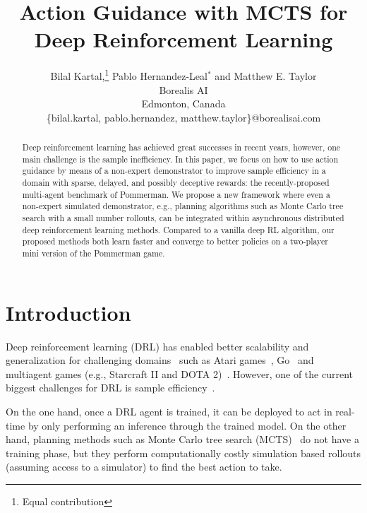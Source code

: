 \documentclass[letterpaper]{article} %
\title{Action Guidance with MCTS for Deep Reinforcement Learning} %
\author{Bilal Kartal,\thanks{Equal contribution} Pablo Hernandez-Leal$^*$ and Matthew E. Taylor\\
Borealis AI\\
Edmonton, Canada\\
\{bilal.kartal, pablo.hernandez, matthew.taylor\}@borealisai.com
}
\begin{document}
\maketitle

\begin{abstract}

Deep reinforcement learning has achieved great successes in recent years, however, one main challenge is the sample inefficiency. In this paper, we focus on how to use action guidance by means of a non-expert demonstrator to improve sample efficiency in a domain with sparse, delayed, and possibly deceptive rewards: the recently-proposed multi-agent benchmark of Pommerman. We propose a new framework where even a non-expert simulated demonstrator, e.g., planning algorithms such as Monte Carlo tree search with a small number rollouts, can be integrated within asynchronous distributed deep reinforcement learning methods. Compared to a vanilla deep RL algorithm, our proposed methods both learn faster and converge to better policies on a two-player mini version of the Pommerman game.

\end{abstract}

\maketitle

\section{Introduction}


\noindent Deep reinforcement learning (DRL) has enabled better scalability and generalization for challenging domains~\cite{arulkumaran2017deep,li2017deep,hernandez2018multiagent} such as Atari games~\cite{mnih2015human}, Go~\cite{silver2016mastering} and multiagent games (e.g., Starcraft II and DOTA 2)~\cite{openfive}. However, one of the current biggest challenges for DRL is sample efficiency~\cite{yu2018towards}.


On the one hand, once a DRL agent is trained, it can be deployed to act in real-time by only performing an inference through the trained model. On the other hand, planning methods such as Monte Carlo tree search (MCTS)~\cite{browne2012survey} do not have a training phase, but they perform computationally costly simulation based rollouts (assuming access to a simulator) to find the best action to take. %
\end{document}
